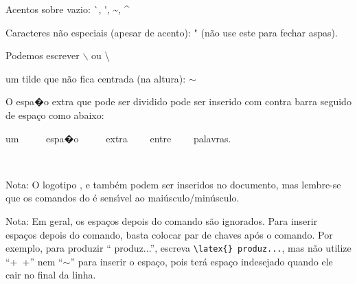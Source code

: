 \documentclass{article}
\begin{document}

Acentos sobre vazio: \`{}, \'{}, \~{}, \^{}

Caracteres n\~ao especiais (apesar de acento): " (n\~ao use este para fechar aspas).


Podemos escrever $\backslash$  ou \textbackslash


um tilde que n\~ao fica centrada (na altura): $\sim$



O espa�o extra que pode ser dividido pode ser inserido com contra barra seguido de espa\c co como abaixo:

um \ \ \ \ \ espa�o \ \ \ \ \ extra \ \ \ \ entre \ \ \ \ palavras.


\
 
Nota: O logotipo \tex, \latex{} e \latexe{} tamb\'em podem ser inseridos no documento, mas lembre-se que
os comandos do \tex{} \'e sens\'\i vel ao mai\'usculo/min\'usculo.

Nota: Em geral, os espa\c cos depois do comando s\~ao ignorados.
Para inserir espa\c cos depois do comando, basta colocar par de chaves ap\'os o comando.
Por exemplo, para produzir ``\latex{} produz...'', 
escreva \verb*+\latex{} produz...+, mas n\~ao utilize ``+\ +'' nem ``$\sim$'' para inserir o espa\c co, 
pois ter\'a espa\c co indesejado quando ele cair no final da linha.
\end{document}
